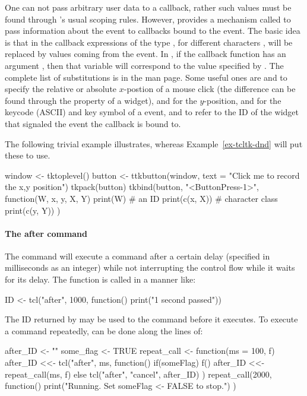 One can not pass arbitrary user data to a callback, rather such values
must be found through \R's usual scoping rules. However, \TK\/
provides a mechanism called  to pass
information about the event to callbacks bound to the event. The basic
idea is that in the \TCL\/ callback expressions of the type
, for different characters , will be replaced by values
coming from the event. In , if the callback function has an
argument , then that variable will correspond to the value
specified by . The complete list of substitutions is in the
 man page. Some useful ones are  and  to
specify the relative or absolute $x$-postion of a mouse click (the
difference can be found through the  property of a
widget),  and  for the $y$-position,  and
 for the keycode (ASCII) and key symbol of a
 event, and  to refer to the ID of the
widget that signaled the event the callback is bound
to. 

The following trivial example illustrates, whereas
Example~\ref{ex-tcltk-dnd} will put these to use.

\begin{Schunk}
\begin{Sinput}
 window <- tktoplevel()
 button <- ttkbutton(window, text = "Click me to record the x,y position")
 tkpack(button)
 tkbind(button, "<ButtonPress-1>", function(W, x, y, X, Y) {
   print(W)                              # an ID
   print(c(x, X))                        # character class
   print(c(y, Y))
   })
\end{Sinput}
\end{Schunk}




\paragraph{The after command}
The \TCL\/ command  will execute a command after a certain
delay (specified in milliseconds as an integer) while not interrupting
the control flow while it waits for its delay. The function is called
in a manner like:
\begin{Schunk}
  \begin{Sinput}
ID <- tcl("after", 1000, function() print("1 second passed"))    
  \end{Sinput}
\end{Schunk}
The ID returned by  may be used to  the
command before it executes. To execute a command repeatedly, can be
done along the lines of:
\begin{Schunk}
\begin{Sinput}
 after_ID <- ""
 some_flag <- TRUE
 repeat_call <- function(ms = 100, f) {
   after_ID <<- tcl("after", ms, function() {
     if(someFlag) {                      
       f()
       after_ID <<- repeat_call(ms, f)
     }  else {
       tcl("after", "cancel", after_ID)
     }
   })
 }
 repeat_call(2000, function() {
   print("Running. Set someFlag <- FALSE to stop.")
 })
\end{Sinput}
\end{Schunk}
%


